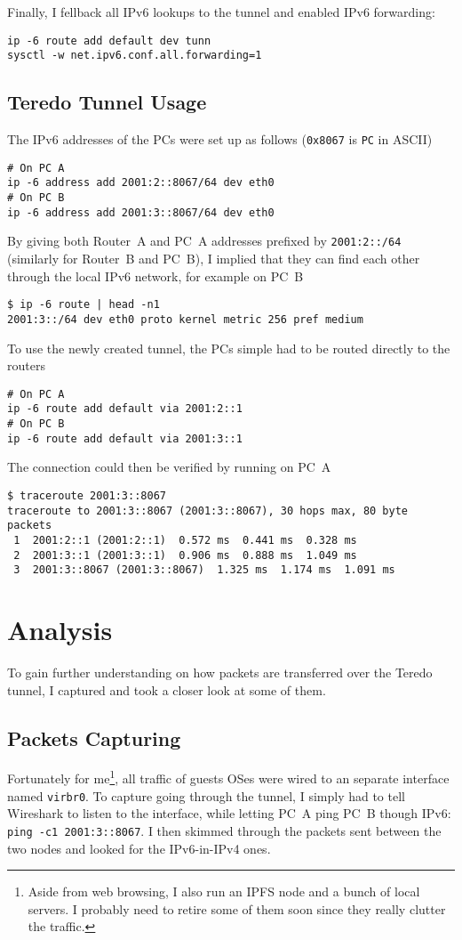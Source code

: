 \documentclass[a4paper,12pt]{article}
\begin{document}
Finally, I fellback all IPv6 lookups to the tunnel and enabled IPv6 forwarding:
\begin{verbatim}
ip -6 route add default dev tunn
sysctl -w net.ipv6.conf.all.forwarding=1
\end{verbatim}

\subsection{Teredo Tunnel Usage}
The IPv6 addresses of the PCs were set up as follows
(\verb|0x8067| is \verb|PC| in ASCII)
\begin{verbatim}
# On PC A
ip -6 address add 2001:2::8067/64 dev eth0
# On PC B
ip -6 address add 2001:3::8067/64 dev eth0
\end{verbatim}

By giving both Router~A and PC~A addresses prefixed by \verb|2001:2::/64|
(similarly for Router~B and PC~B), I implied that they can find each other
through the local IPv6 network, for example on PC~B
\begin{verbatim}
$ ip -6 route | head -n1
2001:3::/64 dev eth0 proto kernel metric 256 pref medium
\end{verbatim}

To use the newly created tunnel,
the PCs simple had to be routed directly to the routers
\begin{verbatim}
# On PC A
ip -6 route add default via 2001:2::1
# On PC B
ip -6 route add default via 2001:3::1
\end{verbatim}

The connection could then be verified by running on PC~A
\begin{verbatim}
$ traceroute 2001:3::8067
traceroute to 2001:3::8067 (2001:3::8067), 30 hops max, 80 byte packets
 1  2001:2::1 (2001:2::1)  0.572 ms  0.441 ms  0.328 ms
 2  2001:3::1 (2001:3::1)  0.906 ms  0.888 ms  1.049 ms
 3  2001:3::8067 (2001:3::8067)  1.325 ms  1.174 ms  1.091 ms
\end{verbatim}

\section{Analysis}
To gain further understanding on how packets are transferred over
the Teredo tunnel, I captured and took a closer look at some of them.

\subsection{Packets Capturing}
Fortunately for me\footnote{Aside from web browsing, I also run an IPFS node
and a bunch of local servers.  I probably need to retire some of them soon
since they really clutter the traffic.}, all traffic of guests OSes were wired
to an separate interface named \verb|virbr0|.  To capture going through
the tunnel, I simply had to tell Wireshark to listen to the interface,
while letting PC~A ping PC~B though IPv6: \verb|ping -c1 2001:3::8067|.
I then skimmed through the packets sent between the two nodes and looked for
the IPv6-in-IPv4 ones.
\end{document}
